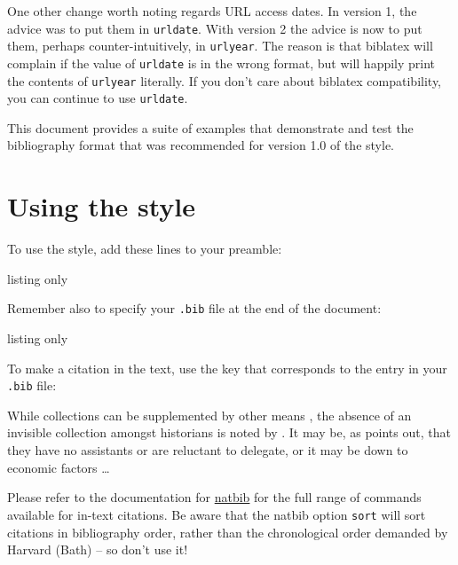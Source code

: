 \documentclass[10pt,a4paper]{article}
\newcommand*{\urlprefix}{Available from: }
\newcommand*{\urldateprefix}{Accessed }
\begin{document}
One other change worth noting regards URL access dates. In version 1, the
advice was to put them in \texttt{urldate}. With version 2 the advice is now
to put them, perhaps counter-intuitively, in \texttt{urlyear}. The reason is that
\textsf{biblatex} will complain if the value of \texttt{urldate} is in the wrong
format, but will happily print the contents of \texttt{urlyear} literally. If
you don't care about \textsf{biblatex} compatibility, you can continue to use
\texttt{urldate}.

This document provides a suite of examples that demonstrate and test the
bibliography format that was recommended for version 1.0 of the style.

\section{Using the style}

To use the style, add these lines to your preamble:

\begin{tcblisting}{listing only}
\usepackage{natbib}
\newcommand*{\urlprefix}{Available from: }
\newcommand*{\urldateprefix}{Accessed }

\end{tcblisting}

Remember also to specify your \texttt{.bib} file at the end of the document:

\begin{tcblisting}{listing only}

\end{tcblisting}

To make a citation in the text, use the key that corresponds to the entry in your \texttt{.bib} file:

\begin{tcblisting}{}
While collections can be supplemented by other means \citep{williams1997edd},
the absence of an invisible collection amongst historians is noted by
\citet[p.556]{stieg1981inh}. It may be, as \citet{burchard1965hhl} points out,
that they have no assistants or are reluctant to delegate, or it may be
down to economic factors \citep{adams2009tc1, adams2014tc2, gb.pa2014,
adams2017tc3}\dots
\end{tcblisting}

Please refer to the documentation for \href{http://www.ctan.org/pkg/natbib}{\textsf{natbib}}
for the full range of commands available for in-text citations. Be aware that the
\textsf{natbib} option \texttt{sort} will sort citations in bibliography order,
rather than the chronological order demanded by Harvard (Bath) -- so don't use it!
\end{document}

